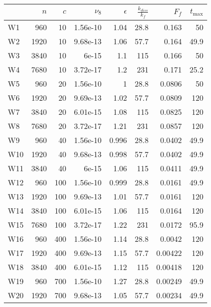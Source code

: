 \begin{tabular}{lrrrrrrr}
\toprule
{} &   $n$ &  $c$ &  $\nu_8$ &  $\epsilon$ &  $\frac{k_{diss}}{k_f}$ &   $F_f$ &  $t_{\max}$ \\
\midrule
W1  &   960 &   10 & 1.56e-10 &        1.04 &                    28.8 &   0.163 &          50 \\
W2  &  1920 &   10 & 9.68e-13 &        1.06 &                    57.7 &   0.164 &        49.9 \\
W3  &  3840 &   10 &    6e-15 &         1.1 &                     115 &   0.166 &          50 \\
W4  &  7680 &   10 & 3.72e-17 &         1.2 &                     231 &   0.171 &        25.2 \\
W5  &   960 &   20 & 1.56e-10 &           1 &                    28.8 &  0.0806 &          50 \\
W6  &  1920 &   20 & 9.69e-13 &        1.02 &                    57.7 &  0.0809 &         120 \\
W7  &  3840 &   20 & 6.01e-15 &        1.08 &                     115 &  0.0825 &         120 \\
W8  &  7680 &   20 & 3.72e-17 &        1.21 &                     231 &  0.0857 &         120 \\
W9  &   960 &   40 & 1.56e-10 &       0.996 &                    28.8 &  0.0402 &        49.9 \\
W10 &  1920 &   40 & 9.68e-13 &       0.998 &                    57.7 &  0.0402 &        49.9 \\
W11 &  3840 &   40 &    6e-15 &        1.06 &                     115 &  0.0411 &        49.9 \\
W12 &   960 &  100 & 1.56e-10 &       0.999 &                    28.8 &  0.0161 &        49.9 \\
W13 &  1920 &  100 & 9.69e-13 &        1.01 &                    57.7 &  0.0161 &         120 \\
W14 &  3840 &  100 & 6.01e-15 &        1.06 &                     115 &  0.0164 &         120 \\
W15 &  7680 &  100 & 3.72e-17 &        1.22 &                     231 &  0.0172 &        95.9 \\
W16 &   960 &  400 & 1.56e-10 &        1.14 &                    28.8 &  0.0042 &         120 \\
W17 &  1920 &  400 & 9.69e-13 &        1.15 &                    57.7 & 0.00422 &         120 \\
W18 &  3840 &  400 & 6.01e-15 &        1.12 &                     115 & 0.00418 &         120 \\
W19 &   960 &  700 & 1.56e-10 &        1.27 &                    28.8 & 0.00249 &        49.9 \\
W20 &  1920 &  700 & 9.68e-13 &        1.05 &                    57.7 & 0.00234 &        49.9 \\
\bottomrule
\end{tabular}
